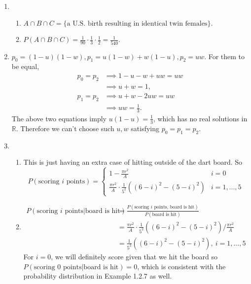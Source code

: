 \documentclass{article}
\begin{document}
\begin{enumerate}
    \item \begin{enumerate}
        \item $A \cap B \cap C = \{ \text{a U.S. birth resulting in identical twin females} \}$.
        \item $P(A \cap B \cap C) = \frac{1}{90} \cdot \frac{1}{3} \cdot \frac{1}{2} 
        = \frac{1}{540}$.
    \end{enumerate}

    \item $p_0 = (1 - u)(1 - w), p_1 = u(1 - w) + w(1 - u), p_2 = uw$. For them to be equal, 
    \begin{align*}
        p_0 = p_2 
        &\implies 1 - u - w + uw = uw \\
        &\implies u + w = 1, \\
        p_1 = p_2
        &\implies u + w - 2uw = uw \\
        &\implies uw = \frac{1}{3}.
    \end{align*}
    The above two equations imply $u(1 - u) = \frac{1}{3}$, which has no real solutions in 
    $\mathbb{R}$. Therefore we can't choose such $u, w$ satisfying $p_0 = p_1 = p_2$.
    \item \begin{enumerate}
        \item This is just having an extra case of hitting outside of the dart board. So 
        \[ P(\text{scoring } i \text{ points}) = \begin{cases}
            1 - \frac{\pi r^2}{A} & i = 0 \\
            \frac{\pi r^2}{A} \cdot \frac{1}{5^2} ((6 - i)^2 - (5 - i)^2) & i = 1, ..., 5
        \end{cases} \]

        \item \begin{align*}
            P(\text{scoring } i \text{ points}|\text{board is hit})
            &= \frac{P(\text{scoring } i \text{ points, board is hit})}
            {P(\text{board is hit})} \\
            &= \frac{\pi r^2}{A} \cdot \frac{1}{5^2} ((6 - i)^2 - (5 - i)^2) 
            / \frac{\pi r^2}{A} \\
            &= \frac{1}{5^2} ((6 - i)^2 - (5 - i)^2), \ i = 1, ..., 5
        \end{align*}
        For $i = 0$, we will definitely score given that we hit the board so \\
        $P(\text{scoring 0 points} | \text{board is hit}) = 0$, which is consistent with the 
        probability distribution in Example 1.2.7 as well.
    \end{enumerate}


\end{enumerate}
\end{document}
